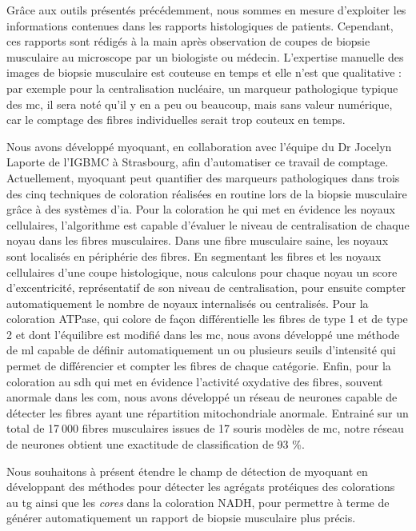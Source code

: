 Grâce aux outils présentés précédemment, nous sommes en mesure d’exploiter les informations contenues dans les rapports histologiques de patients. Cependant, ces rapports sont rédigés à la main après observation de coupes de biopsie musculaire au microscope par un biologiste ou médecin. L’expertise manuelle des images de biopsie musculaire est couteuse en temps et elle n’est que qualitative : par exemple pour la centralisation nucléaire, un marqueur pathologique typique des \gls{mc}, il sera noté qu’il y en a peu ou beaucoup, mais sans valeur numérique, car le comptage des fibres individuelles serait trop couteux en temps. 

Nous avons développé \gls{myoquant}, en collaboration avec l’équipe du Dr Jocelyn Laporte de l’IGBMC à Strasbourg, afin d’automatiser ce travail de comptage. Actuellement, \gls{myoquant} peut quantifier des marqueurs pathologiques dans trois des cinq techniques de coloration réalisées en routine lors de la biopsie musculaire grâce à des systèmes d’\gls{ia}. Pour la coloration \gls{he} qui met en évidence les noyaux cellulaires, l’algorithme est capable d’évaluer le niveau de centralisation de chaque noyau dans les fibres musculaires. Dans une fibre musculaire saine, les noyaux sont localisés en périphérie des fibres. En segmentant les fibres et les noyaux cellulaires d’une coupe histologique, nous calculons pour chaque noyau un score d’excentricité, représentatif de son niveau de centralisation, pour ensuite compter automatiquement le nombre de noyaux internalisés ou centralisés. Pour la coloration ATPase, qui colore de façon différentielle les fibres de type 1 et de type 2 et dont l'équilibre est modifié dans les \gls{mc}, nous avons développé une méthode de \gls{ml} capable de définir automatiquement un ou plusieurs seuils d’intensité qui permet de différencier et compter les fibres de chaque catégorie. Enfin, pour la coloration au \gls{sdh} qui met en évidence l’activité oxydative des fibres, souvent anormale dans les \gls{com}, nous avons développé un réseau de neurones capable de détecter les fibres ayant une répartition mitochondriale anormale. Entrainé sur un total de 17 000 fibres musculaires issues de 17 souris modèles de \gls{mc}, notre réseau de neurones obtient une exactitude de classification de 93 \%.

Nous souhaitons à présent étendre le champ de détection de \gls{myoquant} en développant des méthodes pour détecter les agrégats protéiques des colorations au \gls{tg} ainsi que les \textit{cores} dans la coloration NADH, pour permettre à terme de générer automatiquement un rapport de biopsie musculaire plus précis. 

